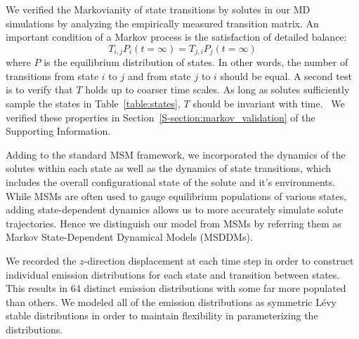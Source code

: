 \documentclass{article}
\begin{document}
  We verified the Markovianity of state transitions by solutes in our MD simulations 
  by analyzing the empirically measured transition matrix. An important condition
  of a Markov process is the satisfaction of detailed balance:
  \begin{equation}
  T_{i,j}P_i(t=\infty) = T_{j,i}P_j(t=\infty)
  \end{equation}
  where $P$ is the equilibrium distribution of states. In other words, the number of
  transitions from state $i$ to $j$ and from state $j$ to $i$ should be equal. A second
  test is to verify that $T$ holds up to coarser time scales. As long as solutes
  sufficiently sample the states in Table~\ref{table:states}, $T$ should be invariant
  with time.~\cite{swope_describing_2004} We verified these properties 
  in Section~\ref{S-section:markov_validation} of the Supporting Information.
  
  
  Adding to the standard MSM framework, we incorporated the dynamics of the solutes
  within each state as well as the dynamics of state transitions, which includes the
  overall configurational state of the solute and it's environments. 
  While MSMs are often used to gauge equilibrium populations of various states, adding 
  state-dependent dynamics allows us to more accurately simulate solute trajectories.
  Hence we distinguish our model from MSMs by referring them as Markov State-Dependent
  Dynamical Models (MSDDMs). 
  
  We recorded the $z$-direction displacement at each time step in order to construct 
  individual emission distributions for each state and transition between states. 
  This results in 64 distinct emission distributions with some far more populated than
  others. We modeled all of the emission distributions as symmetric L\'evy stable 
  distributions in order to maintain flexibility in parameterizing the distributions.
  
\end{document}
